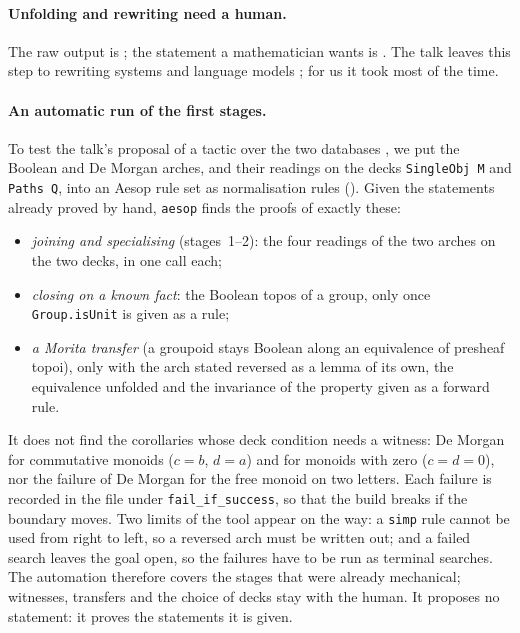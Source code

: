 \paragraph{Unfolding and rewriting need a human.} The raw output is ; the statement a mathematician wants is . The talk leaves this step to rewriting systems and language models \cite[slide 17]{caramello-mines}; for us it took most of the time.

\paragraph{An automatic run of the first stages.} To test the talk's proposal of a tactic over the two databases \cite[slide 17]{caramello-mines}, we put the Boolean and De Morgan arches, and their readings on the decks \texttt{SingleObj M} and \texttt{Paths Q}, into an Aesop rule set \cite{aesop} as normalisation rules (). Given the statements already proved by hand, \texttt{aesop} finds the proofs of exactly these:
\begin{itemize}
\item \emph{joining and specialising} (stages~1--2): the four readings of the two arches on the two decks, in one call each;
\item \emph{closing on a known fact}: the Boolean topos of a group, only once \texttt{Group.isUnit} is given as a rule;
\item \emph{a Morita transfer} (a groupoid stays Boolean along an equivalence of presheaf topoi), only with the arch stated reversed as a lemma of its own, the equivalence unfolded and the invariance of the property given as a forward rule.
\end{itemize}
It does not find the corollaries whose deck condition needs a witness: De Morgan for commutative monoids ($c=b$, $d=a$) and for monoids with zero ($c=d=0$), nor the failure of De Morgan for the free monoid on two letters. Each failure is recorded in the file under \texttt{fail\_if\_success}, so that the build breaks if the boundary moves. Two limits of the tool appear on the way: a \texttt{simp} rule cannot be used from right to left, so a reversed arch must be written out; and a failed search leaves the goal open, so the failures have to be run as terminal searches. The automation therefore covers the stages that were already mechanical; witnesses, transfers and the choice of decks stay with the human. It proposes no statement: it proves the statements it is given.

